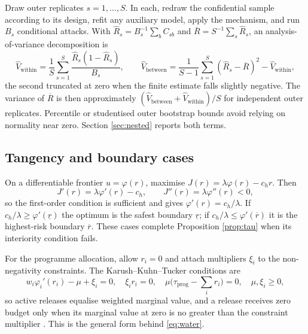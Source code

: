 \documentclass[11pt,a4paper]{article}
\theoremstyle{plain}
\theoremstyle{definition}
\theoremstyle{definition}
\theoremstyle{plain}
\begin{document}
Draw outer replicates $s=1,\dots,S$. In each, redraw the confidential sample
according to its design, refit any auxiliary model, apply the mechanism, and run
$B_s$ conditional attacks. With $\widehat R_s=B_s^{-1}\sum_b C_{sb}$ and
$\overline R=S^{-1}\sum_s \widehat R_s$, an analysis-of-variance decomposition is
\begin{equation}
\widehat V_{\mathrm{within}}
 =\frac1S\sum_{s=1}^S\frac{\widehat R_s(1-\widehat R_s)}{B_s},\qquad
\widehat V_{\mathrm{between}}
 =\frac{1}{S-1}\sum_{s=1}^S(\widehat R_s-\overline R)^2
   -\widehat V_{\mathrm{within}},
\end{equation}
the second truncated at zero when the finite estimate falls slightly negative.
The variance of $\overline R$ is then approximately
$(\widehat V_{\mathrm{between}}+\widehat V_{\mathrm{within}})/S$ for independent
outer replicates. Percentile or studentised outer bootstrap bounds avoid relying
on normality near zero. Section \ref{sec:nested} reports both terms.

\subsection{Tangency and boundary cases}

On a differentiable frontier $u=\varphi(r)$, maximise
$J(r)=\lambda\varphi(r)-c_hr$. Then
\begin{equation}
J'(r)=\lambda\varphi'(r)-c_h,\qquad
J''(r)=\lambda\varphi''(r)<0,
\end{equation}
so the first-order condition is sufficient and gives $\varphi'(r)=c_h/\lambda$.
If $c_h/\lambda\ge\varphi'(\underline r)$ the optimum is the safest boundary
$\underline r$; if $c_h/\lambda\le\varphi'(\overline r)$ it is the highest-risk
boundary $\overline r$. These cases complete Proposition \ref{prop:tau} when its
interiority condition fails.

For the programme allocation, allow $r_i=0$ and attach multipliers $\xi_i$ to the
non-negativity constraints. The Karush--Kuhn--Tucker conditions are
\begin{equation}
w_i\varphi_i'(r_i)-\mu+\xi_i=0,\quad \xi_i r_i=0,\quad
\mu\Big(\tau_{\mathrm{prog}}-\sum_i r_i\Big)=0,\quad \mu,\xi_i\ge0 ,
\end{equation}
so active releases equalise weighted marginal value, and a release receives zero
budget only when its marginal value at zero is no greater than the constraint multiplier
\citep{boyd2004}. This is the general form behind \eqref{eq:water}.
\end{document}
